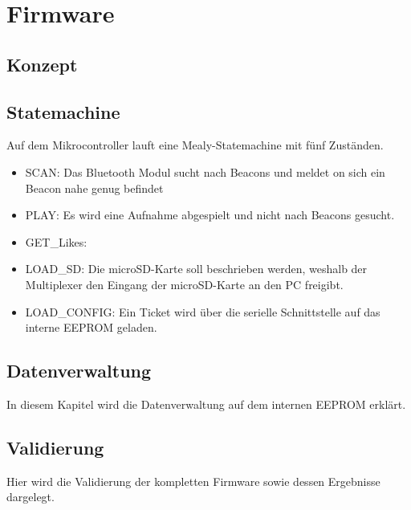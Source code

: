 \chapter{Firmware}
\label{Firmware}
\thispagestyle{fancy} 
\section{Konzept}
\section{Statemachine}
Auf dem Mikrocontroller lauft eine Mealy-Statemachine mit fünf Zuständen.
\begin{itemize}
	\item SCAN: Das Bluetooth Modul sucht nach Beacons und meldet on sich ein Beacon nahe genug befindet
	\item PLAY: Es wird eine Aufnahme abgespielt und nicht nach Beacons gesucht.
	\item GET\_Likes:
	\item LOAD\_SD: Die microSD-Karte soll beschrieben werden, weshalb der Multiplexer den Eingang der microSD-Karte an den PC freigibt.
	\item LOAD\_CONFIG: Ein Ticket wird über die serielle Schnittstelle auf das interne EEPROM geladen.
\end{itemize}
\section{Datenverwaltung}
In diesem Kapitel wird die Datenverwaltung auf dem internen EEPROM erklärt.
\section{Validierung}
Hier wird die Validierung der kompletten Firmware sowie dessen Ergebnisse dargelegt. 
